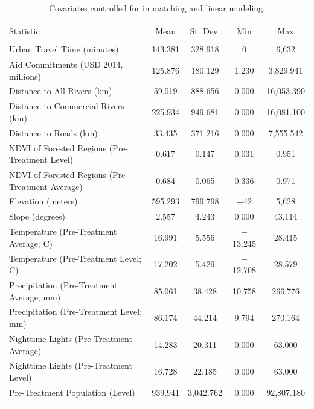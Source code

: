 \documentclass[sustainability,article,submit,moreauthors,pdftex,10pt,a4paper]{mdpi}
\begin{document}
\begin{table}[!htbp] \centering 
  \caption{Covariates controlled for in matching and linear modeling.} 
  \label{wb_desc} 
\begin{tabular}{@{\extracolsep{5pt}}lcccc} 
\\[-1.8ex]\hline 
\hline \\[-1.8ex] 
Statistic & \multicolumn{1}{c}{Mean} & \multicolumn{1}{c}{St. Dev.} & \multicolumn{1}{c}{Min} & \multicolumn{1}{c}{Max} \\ 
\hline \\[-1.8ex] 
Urban Travel Time (minutes) & 143.381 & 328.918 & 0 & 6,632 \\ 
Aid Commitments (USD 2014, millions) & 125.876 & 180.129 & 1.230 & 3,829.941 \\ 
Distance to All Rivers (km) & 59.019 & 888.656 & 0.000 & 16,053.390 \\ 
Distance to Commercial Rivers (km) & 225.934 & 949.681 & 0.000 & 16,081.100 \\ 
Distance to Roads (km) & 33.435 & 371.216 & 0.000 & 7,555.542 \\ 
NDVI of Forested Regions (Pre-Treatment Level) & 0.617 & 0.147 & 0.031 & 0.951 \\ 
NDVI of Forested Regions (Pre-Treatment Average) & 0.684 & 0.065 & 0.336 & 0.971 \\ 
Elevation (meters) & 595.293 & 799.798 & $-$42 & 5,628 \\ 
Slope (degrees) & 2.557 & 4.243 & 0.000 & 43.114 \\ 
Temperature (Pre-Treatment Average; C) & 16.991 & 5.556 & $-$13.245 & 28.415 \\ 
Temperature (Pre-Treatment Level; C) & 17.202 & 5.429 & $-$12.708 & 28.579 \\ 
Precipitation (Pre-Treatment Average; mm) & 85.061 & 38.428 & 10.758 & 266.776 \\ 
Precipitation (Pre-Treatment Level; mm) & 86.174 & 44.214 & 9.794 & 270.164 \\ 
Nighttime Lights (Pre-Treatment Average) & 14.283 & 20.311 & 0.000 & 63.000 \\ 
Nighttime Lights (Pre-Treatment Level) & 16.728 & 22.185 & 0.000 & 63.000 \\ 
Pre-Treatment Population (Level) & 939.941 & 3,042.762 & 0.000 & 92,807.180 \\ 
\hline \\[-1.8ex] 
\end{tabular} 
\end{table} 
\end{document}
